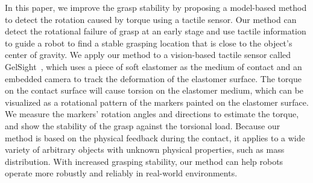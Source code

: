 In this paper, we improve the grasp stability by proposing a model-based method to detect the rotation caused by torque using a tactile sensor. Our method can detect the rotational failure of grasp at an early stage and use tactile information to guide a robot to find a stable grasping location that is close to the object's center of gravity. We apply our method to a vision-based tactile sensor called GelSight~\cite{gelsight-base}, which uses a piece of soft elastomer as the medium of contact and an embedded camera to track the deformation of the elastomer surface. The torque on the contact surface will cause torsion on the elastomer medium, which can be visualized as a rotational pattern of the markers painted on the elastomer surface. We measure the markers' rotation angles and directions to estimate the torque, and show the stability of the grasp against the torsional load.
Because our method is based on the physical feedback during the contact, it applies to a wide variety of arbitrary objects with unknown physical properties, such as mass distribution. With increased grasping stability, our method can help robots operate more robustly and reliably in real-world environments.






